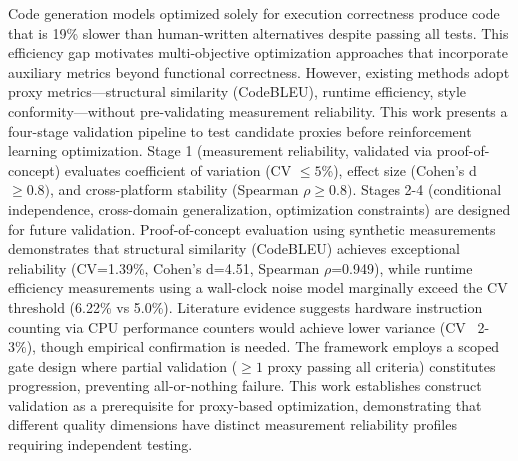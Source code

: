 
Code generation models optimized solely for execution correctness produce code that is 19\% slower than human-written alternatives despite passing all tests. This efficiency gap motivates multi-objective optimization approaches that incorporate auxiliary metrics beyond functional correctness. However, existing methods adopt proxy metrics---structural similarity (CodeBLEU), runtime efficiency, style conformity---without pre-validating measurement reliability. This work presents a four-stage validation pipeline to test candidate proxies before reinforcement learning optimization. Stage 1 (measurement reliability, validated via proof-of-concept) evaluates coefficient of variation (CV $\leq 5$\%), effect size (Cohen's d $\geq 0.8)$, and cross-platform stability (Spearman $\rho \geq 0.8)$. Stages 2-4 (conditional independence, cross-domain generalization, optimization constraints) are designed for future validation. Proof-of-concept evaluation using synthetic measurements demonstrates that structural similarity (CodeBLEU) achieves exceptional reliability (CV=1.39\%, Cohen's d=4.51, Spearman $\rho$=0.949), while runtime efficiency measurements using a wall-clock noise model marginally exceed the CV threshold (6.22\% vs 5.0\%). Literature evidence suggests hardware instruction counting via CPU performance counters would achieve lower variance (CV ~2-3\%), though empirical confirmation is needed. The framework employs a scoped gate design where partial validation ($\geq 1$ proxy passing all criteria) constitutes progression, preventing all-or-nothing failure. This work establishes construct validation as a prerequisite for proxy-based optimization, demonstrating that different quality dimensions have distinct measurement reliability profiles requiring independent testing.
